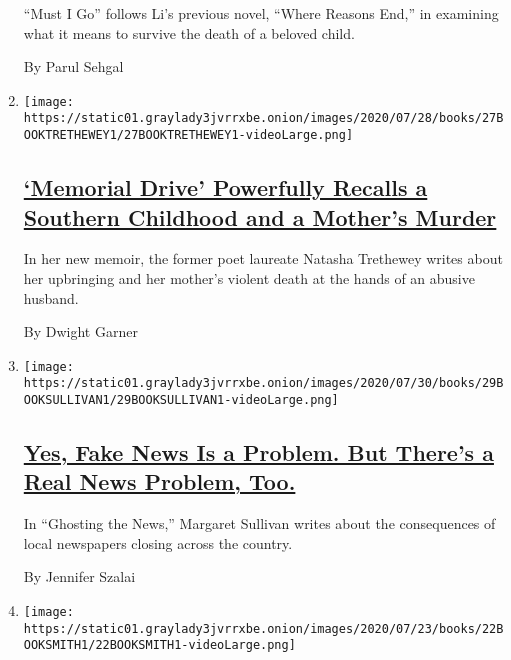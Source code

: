 \begin{enumerate}
  ``Must I Go'' follows Li's previous novel, ``Where Reasons End,'' in
  examining what it means to survive the death of a beloved child.

  By Parul Sehgal
\item
  \texttt{[image: https://static01.graylady3jvrrxbe.onion/images/2020/07/28/books/27BOOKTRETHEWEY1/27BOOKTRETHEWEY1-videoLarge.png]}

  \hypertarget{memorial-drive-powerfully-recalls-a-southern-childhood-and-a-mothers-murder}{%
  \subsection{\texorpdfstring{\href{/2020/07/27/books/review-memorial-drive-memoir-natasha-trethewey.html}{`Memorial
  Drive' Powerfully Recalls a Southern Childhood and a Mother's
  Murder}}{`Memorial Drive' Powerfully Recalls a Southern Childhood and a Mother's Murder}}\label{memorial-drive-powerfully-recalls-a-southern-childhood-and-a-mothers-murder}}

  In her new memoir, the former poet laureate Natasha Trethewey writes
  about her upbringing and her mother's violent death at the hands of an
  abusive husband.

  By Dwight Garner
\item
  \texttt{[image: https://static01.graylady3jvrrxbe.onion/images/2020/07/30/books/29BOOKSULLIVAN1/29BOOKSULLIVAN1-videoLarge.png]}

  \hypertarget{yes-fake-news-is-a-problem-but-theres-a-real-news-problem-too}{%
  \subsection{\texorpdfstring{\href{/2020/07/26/books/review-ghosting-news-local-journalism-democracy-crisis-margaret-sullivan.html}{Yes,
  Fake News Is a Problem. But There's a Real News Problem,
  Too.}}{Yes, Fake News Is a Problem. But There's a Real News Problem, Too.}}\label{yes-fake-news-is-a-problem-but-theres-a-real-news-problem-too}}

  In ``Ghosting the News,'' Margaret Sullivan writes about the
  consequences of local newspapers closing across the country.

  By Jennifer Szalai
\item
  \texttt{[image: https://static01.graylady3jvrrxbe.onion/images/2020/07/23/books/22BOOKSMITH1/22BOOKSMITH1-videoLarge.png]}

  \hypertarget{in-intimations-zadie-smith-applies-her-even-temper-to-tumultuous-times}{%
}
\end{enumerate}
